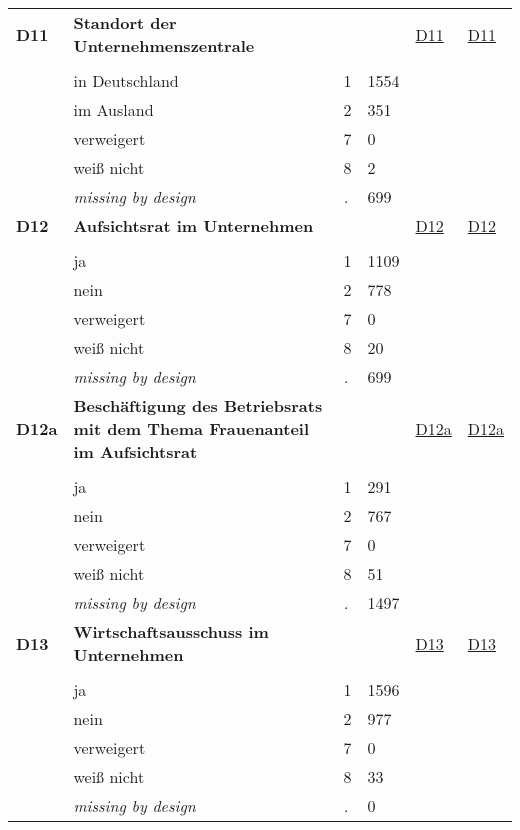 \begin{longtable}{| L{2.45cm} | L{6cm} | C{1.5cm} | R{1cm} | C{2.25cm} | C{2.25cm} |}
   \midrule
\textbf{D11}\label{var:D11} & \textbf{Standort der Unternehmenszentrale} &  &  & \hyperref[D11]{D11} & \hyperref[var:suf:D11]{D11} \\ 
   &  &  &  &  &  \\ 
   & in Deutschland & 1 & 1554 &  &  \\ 
   & im Ausland & 2 & 351 &  &  \\ 
   & verweigert & 7 & 0 &  &  \\ 
   & weiß nicht & 8 & 2 &  &  \\ 
   & \textit{missing by design} & \textit{.} & 699 &  &  \\ 
   \midrule
\textbf{D12}\label{var:D12} & \textbf{Aufsichtsrat im Unternehmen} &  &  & \hyperref[D12]{D12} & \hyperref[var:suf:D12]{D12} \\ 
   &  &  &  &  &  \\ 
   & ja & 1 & 1109 &  &  \\ 
   & nein & 2 & 778 &  &  \\ 
   & verweigert & 7 & 0 &  &  \\ 
   & weiß nicht & 8 & 20 &  &  \\ 
   & \textit{missing by design} & \textit{.} & 699 &  &  \\ 
   \midrule
\textbf{D12a}\label{var:D12a} & \textbf{Beschäftigung des Betriebsrats mit dem Thema Frauenanteil im Aufsichtsrat} &  &  & \hyperref[D12a]{D12a} & \hyperref[var:suf:D12a]{D12a} \\ 
   &  &  &  &  &  \\ 
   & ja & 1 & 291 &  &  \\ 
   & nein & 2 & 767 &  &  \\ 
   & verweigert & 7 & 0 &  &  \\ 
   & weiß nicht & 8 & 51 &  &  \\ 
   & \textit{missing by design} & \textit{.} & 1497 &  &  \\ 
   \midrule
\textbf{D13}\label{var:D13} & \textbf{Wirtschaftsausschuss im Unternehmen} &  &  & \hyperref[D13]{D13} & \hyperref[var:suf:D13]{D13} \\ 
   &  &  &  &  &  \\ 
   & ja & 1 & 1596 &  &  \\ 
   & nein & 2 & 977 &  &  \\ 
   & verweigert & 7 & 0 &  &  \\ 
   & weiß nicht & 8 & 33 &  &  \\ 
   & \textit{missing by design} & \textit{.} & 0 &  &  \\ 

\end{longtable}
